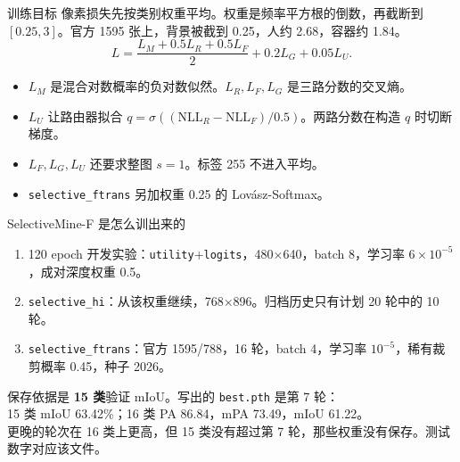 \documentclass[aspectratio=169,11pt]{ctexbeamer}
\begin{document}
\begin{frame}{训练目标}
  像素损失先按类别权重平均。权重是频率平方根的倒数，再截断到 $[0.25,3]$。官方 1595 张上，背景被截到 0.25，人约 2.68，容器约 1.84。
  \[
    L=\frac{L_M+0.5L_R+0.5L_F}{2}+0.2L_G+0.05L_U.
  \]
  \begin{itemize}
    \item $L_M$ 是混合对数概率的负对数似然。$L_R,L_F,L_G$ 是三路分数的交叉熵。
    \item $L_U$ 让路由器拟合 $q=\sigma((\mathrm{NLL}_R-\mathrm{NLL}_F)/0.5)$。两路分数在构造 $q$ 时切断梯度。
    \item $L_F,L_G,L_U$ 还要求整图 $s=1$。标签 255 不进入平均。
    \item \texttt{selective\_ftrans} 另加权重 0.25 的 Lov\'asz-Softmax。
  \end{itemize}
\end{frame}

\begin{frame}{SelectiveMine-F 是怎么训出来的}
  \begin{enumerate}
    \item 120 epoch 开发实验：\texttt{utility}+\texttt{logits}，480$\times$640，batch 8，学习率 $6\times 10^{-5}$，成对深度权重 0.5。
    \item \texttt{selective\_hi}：从该权重继续，768$\times$896。归档历史只有计划 20 轮中的 10 轮。
    \item \texttt{selective\_ftrans}：官方 1595/788，16 轮，batch 4，学习率 $10^{-5}$，稀有裁剪概率 0.45，种子 2026。
  \end{enumerate}
  \vspace{0.4em}
  保存依据是 \textbf{15 类}验证 mIoU。写出的 \texttt{best.pth} 是第 7 轮：\\
  15 类 mIoU 63.42\%；16 类 PA 86.84，mPA 73.49，mIoU 61.22。\\
  更晚的轮次在 16 类上更高，但 15 类没有超过第 7 轮，那些权重没有保存。测试数字对应该文件。
\end{frame}
\end{document}
